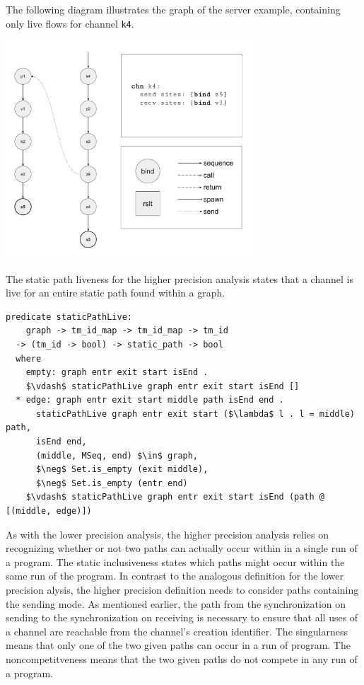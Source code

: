 \documentclass[letterpaper, 11pt]{extarticle}
\begin{document}
The following diagram illustrates the graph of the server example,
containing only live flows for channel \lstinline{k4}. \

\includegraphics[width=0.7\textwidth]{cml-graph-k4.pdf}

The static path liveness for the higher precision analysis states
that a channel is live for an entire static path found within a graph.

\begin{lstlisting}[language=logic, mathescape]
  predicate staticPathLive:
    graph -> tm_id_map -> tm_id_map -> tm_id
  -> (tm_id -> bool) -> static_path -> bool
  where
    empty: graph entr exit start isEnd .
    $\vdash$ staticPathLive graph entr exit start isEnd []
  * edge: graph entr exit start middle path isEnd end .
      staticPathLive graph entr exit start ($\lambda$ l . l = middle) path,
      isEnd end,
      (middle, MSeq, end) $\in$ graph,
      $\neg$ Set.is_empty (exit middle),
      $\neg$ Set.is_empty (entr end)
    $\vdash$ staticPathLive graph entr exit start isEnd (path @ [(middle, edge)])

\end{lstlisting}

As with the lower precision analysis, the higher precision analysis relies on recognizing
whether or not two paths can actually occur within in a single run of a program. The static
inclusiveness states which paths might occur within the same run of the program.
In contrast to the analogous definition for the lower precision
alysis, the higher precision definition needs to consider paths containing the
sending mode. As mentioned earlier, the path from the synchronization on sending to the
synchronization on receiving is necessary to ensure that all uses of a channel are reachable
from the channel's creation identifier. The singularness means that only one of the two
given paths can occur in a run of program. The noncompetitveness means that the two
given paths do not compete in any run of a program. 
\end{document}
